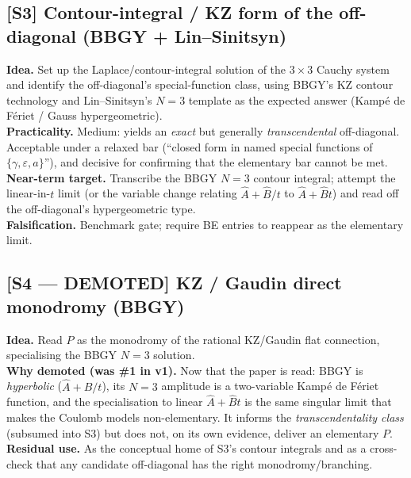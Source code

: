 \documentclass[11pt]{article}
\newcommand{\eps}{\varepsilon}
\begin{document}
\subsection*{[S3] Contour-integral / KZ form of the off-diagonal (BBGY + Lin--Sinitsyn)}
\textbf{Idea.} Set up the Laplace/contour-integral solution of the $3\times3$ Cauchy system and
identify the off-diagonal's special-function class, using BBGY's KZ contour technology and
Lin--Sinitsyn's $N{=}3$ template as the expected answer (Kamp\'e de F\'eriet / Gauss
hypergeometric).\\
\textbf{Practicality.} Medium: yields an \emph{exact} but generally \emph{transcendental}
off-diagonal. Acceptable under a relaxed bar (``closed form in named special functions of
$\{\gamma,\eps,a\}$''), and decisive for confirming that the elementary bar cannot be met.\\
\textbf{Near-term target.} Transcribe the BBGY $N{=}3$ contour integral; attempt the
linear-in-$t$ limit (or the variable change relating $\hat A+\hat B/t$ to $\hat A+\hat Bt$) and
read off the off-diagonal's hypergeometric type.\\
\textbf{Falsification.} Benchmark gate; require BE entries to reappear as the elementary limit.

\subsection*{[S4 --- DEMOTED] KZ / Gaudin direct monodromy (BBGY)}
\textbf{Idea.} Read $P$ as the monodromy of the rational KZ/Gaudin flat connection, specialising
the BBGY $N{=}3$ solution.\\
\textbf{Why demoted (was \#1 in v1).} Now that the paper is read: BBGY is \emph{hyperbolic}
($\hat A+\hat B/t$), its $N{=}3$ amplitude is a two-variable Kamp\'e de F\'eriet function, and the
specialisation to linear $\hat A+\hat Bt$ is the same singular limit that makes the Coulomb models
non-elementary. It informs the \emph{transcendentality class} (subsumed into S3) but does not, on
its own evidence, deliver an elementary $P$.\\
\textbf{Residual use.} As the conceptual home of S3's contour integrals and as a cross-check that
any candidate off-diagonal has the right monodromy/branching.
\end{document}
